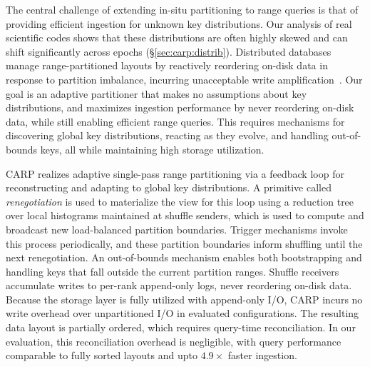 The central challenge of extending in-situ partitioning to range queries is that of providing
efficient ingestion for unknown key distributions.
Our analysis of real scientific codes shows that these distributions are often highly skewed and
can shift significantly across epochs (\S\ref{sec:carp:distrib}).
Distributed databases manage range-partitioned layouts by reactively reordering on-disk data
in response to partition imbalance, incurring unacceptable write
amplification~\cite{Raju2017:PebblesDB,Chang2006:Bigtable}.
Our goal is an adaptive partitioner that makes no assumptions about key distributions,
and maximizes ingestion performance by never reordering on-disk data, while still enabling
efficient range queries.
This requires mechanisms for discovering global key distributions,
reacting as they evolve, and handling out-of-bounds keys, all while maintaining high
storage utilization.


CARP realizes adaptive single-pass range partitioning via a feedback loop for reconstructing
and adapting to global key distributions.
A primitive called \emph{renegotiation} is used to materialize the view for this loop using a
reduction
tree
over local histograms maintained at shuffle senders,
which is used to compute and broadcast new load-balanced partition boundaries.%
Trigger mechanisms invoke this process periodically, and these partition boundaries inform
shuffling until the next renegotiation.
An out-of-bounds mechanism enables both bootstrapping and handling keys that fall outside the
current partition ranges.
Shuffle receivers accumulate writes to per-rank append-only logs, never reordering on-disk data.
Because the storage layer is fully utilized with append-only I/O,
CARP incurs no write overhead over unpartitioned I/O in evaluated configurations.
The resulting data layout is partially ordered, which requires query-time reconciliation.
In our evaluation, this reconciliation overhead is negligible,
with query performance comparable to fully sorted layouts and upto $4.9\times$ faster
ingestion.

